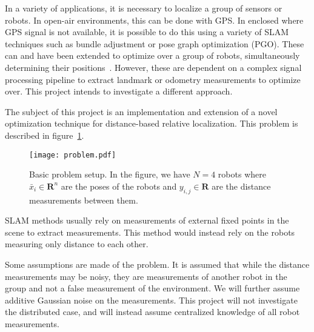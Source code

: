 In a variety of applications, it is necessary to localize a group of sensors or robots. In open-air environments, this can be done with GPS. In enclosed where GPS signal is not available, it is possible to do this using a variety of SLAM techniques such as bundle adjustment or pose graph optimization (PGO). These can and have been extended to optimize over a group of robots, simultaneously determining their positions~\cite{SLAM_distributed}. However, these are dependent on a complex signal processing pipeline to extract landmark or odometry measurements to optimize over. This project intends to investigate a different approach. 

The subject of this project is an implementation and extension of a novel optimization technique for distance-based relative localization. This problem is described in figure~\ref{fig:problem_desc}.
\begin{figure}[ht]
    \centering
    \texttt{[image: problem.pdf]}
    \caption{Basic problem setup. In the figure, we have $N=4$ robots where $\bar{x}_i\in \mathbf{R}^n$ are the poses of the robots and $y_{i,j} \in \mathbf{R}$ are the distance measurements between them. }
    \label{fig:problem_desc}
\end{figure}

SLAM  methods usually rely on measurements of external fixed points in the scene to extract measurements. This method would instead rely on the robots measuring only distance to each other. 

Some assumptions are made of the problem. It is assumed that while the distance measurements may be noisy, they are measurements of another robot in the group and not a false measurement of the environment. We will further assume additive Gaussian noise on the measurements. This project will not investigate the distributed case, and will instead assume centralized knowledge of all robot measurements. 